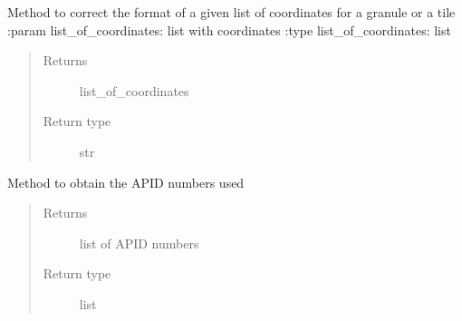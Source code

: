 \begin{fulllineitems}
\label{\detokenize{s2boa.ingestions:s2boa.ingestions.functions.correct_list_of_coordinates_for_gr_tl}}
\sphinxAtStartPar
Method to correct the format of a given list of coordinates for a granule or a tile
:param list\_of\_coordinates: list with coordinates
:type list\_of\_coordinates: list
\begin{quote}\begin{description}
\item[{Returns}] \leavevmode
\sphinxAtStartPar
list\_of\_coordinates

\item[{Return type}] \leavevmode
\sphinxAtStartPar
str

\end{description}\end{quote}

\end{fulllineitems}


\begin{fulllineitems}
\label{\detokenize{s2boa.ingestions:s2boa.ingestions.functions.get_apid_numbers}}
\sphinxAtStartPar
Method to obtain the APID numbers used
\begin{quote}\begin{description}
\item[{Returns}] \leavevmode
\sphinxAtStartPar
list of APID numbers

\item[{Return type}] \leavevmode
\sphinxAtStartPar
list

\end{description}\end{quote}

\end{fulllineitems}


